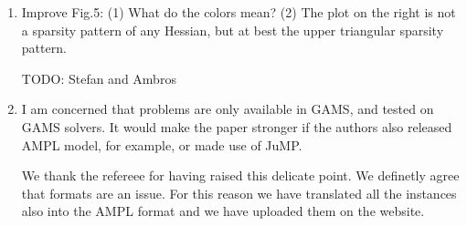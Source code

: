 \documentclass[11pt]{article}
\newcommand{\rep}[1]{{\textcolor{acblue}{#1}}}
\newcommand{\leo}[1]{{\color{red}#1}}
\newcommand{\fabio}[1]{{\color{cyan}#1}}
\begin{document}
{\begin{enumerate}
\rep{
We renamed ``hard" to ``problematic". However, as explained in \S 2.2.1 and 2.2.2, we refrain from reformulating the instance, and we do not tailor problems to specific solvers (moreover, not all QP solvers would resort to reduced Hessians). In the same vein, our analysis can only be based on the given instance structure.
 }


\item Improve Fig.5: (1) What do the colors mean? (2) The plot on the right is not a sparsity pattern
of any Hessian, but at best the upper triangular sparsity pattern.

\rep{TODO: Stefan and Ambros}


\item I am concerned that problems are only available in GAMS, and tested on GAMS solvers. It would make the paper stronger if the authors also released AMPL model, for example, or made use of
JuMP.

\rep{
We thank the refereee for having raised this delicate point. We definetly agree that formats are an issue.
For this reason we have translated all the instances also into the AMPL format and we have uploaded them on the website.
}

\end{enumerate}

}
\end{document}
